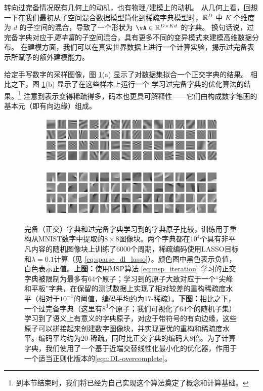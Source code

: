 \documentclass[../../book-main.tex]{subfiles}
\begin{document}
转向过完备情况既有几何上的动机，也有物理/建模上的动机。
从几何上看，回想一下在我们最初从子空间混合数据模型简化到稀疏字典模型时，$\mathbb{R}^D$ 中 $K$ 个维度为 $d$ 的子空间的混合，导致了一个形状为 $\vA \in \R^{D \times Kd}$ 的字典。
换句话说，过完备字典对应于\textit{更丰富}的子空间混合，具有更多不同的变异模式来建模高维数据分布。
在建模方面，我们可以在真实世界数据上进行一个计算实验，揭示过完备表示所赋予的额外建模能力。
\begin{example}
给定手写数字的采样图像，图 \ref{fig:ReconMNIST}(a) 显示了对数据集拟合一个正交字典的结果。
相比之下，图 \ref{fig:ReconMNIST}(b) 显示了在这些样本上运行一个
学习过完备字典的优化算法的结果。\footnote{到本节结束时，我们将已经为自己实现这个算法奠定了概念和计算基础。}
注意到表示变得稀疏得多，码本也更具可解释性——它们由构成数字笔画的基本元（即有向边缘）组成。
\end{example}

\begin{figure}[t]
\centering
    \begin{subfigure}{0.9\linewidth}
        \centering
        \includegraphics[width=\linewidth]{figs_chap2/msp_atoms_patches_new.png}
        \caption{}
    \end{subfigure}
    \begin{subfigure}{0.9\linewidth}
        \centering
        \includegraphics[width=\linewidth]{figs_chap2/palm_atoms_patches_new.png}
        \caption{}
    \end{subfigure}
    \caption{完备（正交）字典和过完备字典学习到的字典原子比较，训练用于重构从MNIST数字中提取的$8 \times 8$图像块。两个字典都在$10^4$个具有非平凡内容的随机图像块上训练了$6000$个周期，稀疏编码使用LASSO目标和$\lambda=0.1$计算（见 \eqref{eq:sparse_dl_lasso}）。颜色图中黑色表示负值，白色表示正值。\textbf{上图：}使用MSP算法 \eqref{eq:msp_iteration} 学习的正交字典被限制为最多有$64$个原子；学习到的原子大致对应于一个“尖峰和平板”字典，在保留的测试数据上实现了相对较差的重构稀疏度水平（相对于$10^{-1}$的阈值，编码平均约为$17$-稀疏）。\textbf{下图：}相比之下，一个过完备字典（这里有$8^3$个原子；我们可视化了$64$个的随机子集）学习到了语义上有意义的字典原子，对应于带符号的有向边缘，这些原子可以拼接起来创建数字图像块，并实现更优的重构和稀疏度水平。编码平均约为$20$-稀疏，同时比正交字典的编码大$8$倍。为了计算字典，我们使用了一个基于近端交替线性化最小化的优化器，作用于一个适当正则化版本的\eqref{eqn:DL-overcomplete}。}
    \label{fig:ReconMNIST}
\end{figure}
\end{document}
